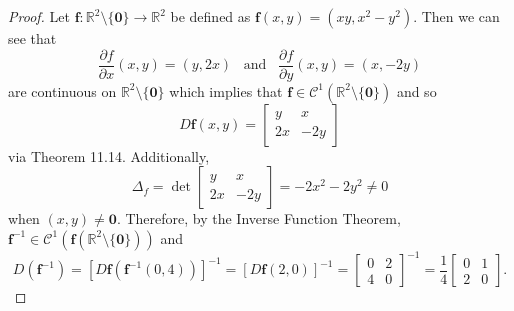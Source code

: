 \documentclass[ 12pt ]{article}
\begin{document}
\begin{enumerate}
			\begin{proof}
				Let $\textbf{f} : \mathbb{R}^2 \setminus \{ \textbf{0} \} \to \mathbb{R}^2$ be defined as $\textbf{f}(x, y) = (xy, x^2 - y^2)$. Then we can see that $$\frac{\partial
				f}{\partial x}(x, y) = (y, 2x)\;\;\; \mathrm{and}\;\;\; \frac{\partial f}{\partial y}(x, y) = (x, -2y)$$ are continuous on $\mathbb{R}^2 \setminus \{ \textbf{0} \}$
				which implies that $\textbf{f} \in \mathcal{C}^1(\mathbb{R}^2 \setminus \{ \textbf{0} \})$ and so $$D\textbf{f}(x, y) = \begin{bmatrix} y & x \\ 2x & -2y \end{bmatrix}$$
				via Theorem 11.14. Additionally, $$\Delta_f = \det \begin{bmatrix} y & x \\ 2x & -2y \end{bmatrix} = -2x^2 - 2y^2 \neq 0$$ when $(x, y) \neq \textbf{0}$. Therefore,
				by the Inverse Function Theorem, $\textbf{f}^{-1} \in \mathcal{C}^1(\textbf{f}(\mathbb{R}^2 \setminus \{ \textbf{0} \} ))$ and $$D(\textbf{f}^{-1}) = [D\textbf{f}(
				\textbf{f}^{-1}(0, 4))]^{-1} = [D\textbf{f}(2, 0)]^{-1} = \begin{bmatrix} 0 & 2 \\ 4 & 0 \end{bmatrix}^{-1} = \frac{1}{4}\begin{bmatrix} 0 & 1 \\ 2 & 0 \end{bmatrix}.$$
			\end{proof}
\end{enumerate}
\end{document}
